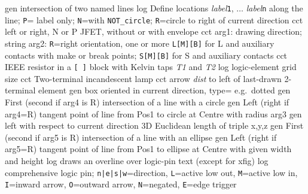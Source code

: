   {gen}
  {intersection of two named lines}
  {log}
  {Define locations {\sl label}{\tt 1}, $\ldots$ {\sl label}{\tt n}
    along the line; {\tt P}= label only;
    {\tt N}=with {\tt NOT\_circle};
    {\tt R}=circle to right of current direction }
  {cct}
  {left or right, N or P JFET, without or with envelope
    }
  {cct}
  {arg1: drawing direction; string arg2: {\tt R}=right orientation,
   one or more {\tt L[M][B]} for L and auxiliary contacts with make or break
   points; {\tt S[M][B]} for S and auxiliary contacts
   }
  {cct}
  {IEEE resistor in a {\tt [ ]} block with Kelvin taps {\sl T1} and {\sl T2}
   }
  {log}
  {logic-element grid size}
  {cct}
  {Two-terminal incandescent lamp
   }
  {cct}
  {arrow {\sl dist} to left of last-drawn 2-terminal element
   }
  {gen}
  {box oriented in current direction, type= e.g.\ dotted}
  {gen}
  { First (second if arg4 is R) intersection of a line with a circle}
  {gen}
  { Left (right if arg4=R) tangent point of line
     from Pos1 to circle at Centre with radius arg3}
  {gen}
  {left with respect to current direction }
  {3D}
  {Euclidean length of triple x,y,z}
  {gen}
  { First (second if arg5 is R) intersection of a line with an ellipse}
  {gen}
  { Left (right if arg5=R) tangent point of line
     from Pos1 to ellipse at Centre with given width and height}
  {log}
  {draws an overline over logic-pin text (except for xfig)}
  {log}
  {comprehensive logic pin; {\tt n|e|s|w}=direction,
    {\tt L}=active low out, {\tt M}=active low in,
    {\tt I}=inward arrow, {\tt O}=outward arrow,
    {\tt N}=negated, {\tt E}=edge trigger}
